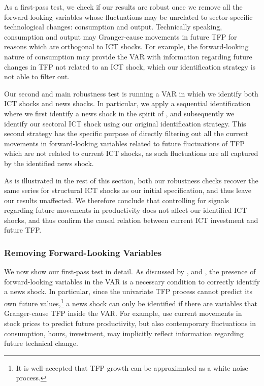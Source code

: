 \documentclass[12pt]{article}
\begin{document}
As a first-pass test, %
we check if our results are robust once we remove all the forward-looking variables whose fluctuations may be unrelated to sector-specific technological changes: consumption and output. Technically speaking, consumption and output may Granger-cause movements in future TFP for reasons which are orthogonal to ICT shocks. For example, the forward-looking nature of consumption may provide the VAR with information regarding future changes in TFP not related to an ICT shock, which our identification strategy is not able to filter out. 

Our second and main robustness test is running a VAR in which we identify both ICT shocks and news shocks. In particular, we apply a sequential identification where we first identify a news shock in the spirit of \cite{barsky2011news}, and subsequently we identify our sectoral ICT shock using our original identification strategy. This second strategy has the specific purpose of directly filtering out all the current movements in forward-looking variables related to future fluctuations of TFP which are not related to current ICT shocks, as such fluctuations are all captured by the identified news shock.

As is illustrated in the rest of this section, both our robustness checks recover the same series for structural ICT shocks as our initial specification, and thus leave our results unaffected. We therefore conclude that controlling for signals regarding future movements in productivity does not affect our identified ICT shocks, and thus confirm the causal relation between current ICT investment and future TFP.

\subsubsection{Removing Forward-Looking Variables}

We now show our first-pass test in detail. As discussed by \cite{sims2012news}, \cite{forni2014sufficient} and \cite{barsky2015whither}, the presence of forward-looking variables in the VAR is a necessary condition to correctly identify a news shock. In particular, since the univariate TFP process cannot predict its own future values,\footnote{It is well-accepted that TFP growth can be approximated as a white noise process.} a news shock can only be identified if there are variables that Granger-cause TFP inside the VAR. For example, \cite{beaudry2006stock} use current movements in stock prices to predict future productivity, but also contemporary fluctuations in consumption, hours, investment, may implicitly reflect information regarding future technical change.
\end{document}
